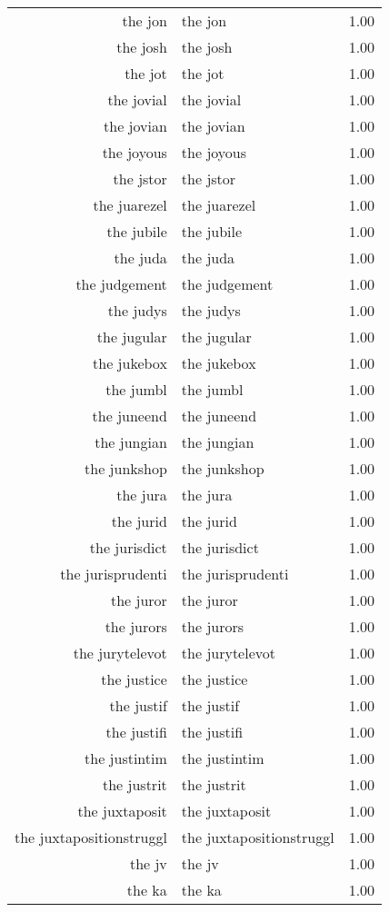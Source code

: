 \begin{table}[ht]
\begin{tabular}{rlr}
  the jon & the jon & 1.00 \\ 
  the josh & the josh & 1.00 \\ 
  the jot & the jot & 1.00 \\ 
  the jovial & the jovial & 1.00 \\ 
  the jovian & the jovian & 1.00 \\ 
  the joyous & the joyous & 1.00 \\ 
  the jstor & the jstor & 1.00 \\ 
  the juarezel & the juarezel & 1.00 \\ 
  the jubile & the jubile & 1.00 \\ 
  the juda & the juda & 1.00 \\ 
  the judgement & the judgement & 1.00 \\ 
  the judys & the judys & 1.00 \\ 
  the jugular & the jugular & 1.00 \\ 
  the jukebox & the jukebox & 1.00 \\ 
  the jumbl & the jumbl & 1.00 \\ 
  the juneend & the juneend & 1.00 \\ 
  the jungian & the jungian & 1.00 \\ 
  the junkshop & the junkshop & 1.00 \\ 
  the jura & the jura & 1.00 \\ 
  the jurid & the jurid & 1.00 \\ 
  the jurisdict & the jurisdict & 1.00 \\ 
  the jurisprudenti & the jurisprudenti & 1.00 \\ 
  the juror & the juror & 1.00 \\ 
  the jurors & the jurors & 1.00 \\ 
  the jurytelevot & the jurytelevot & 1.00 \\ 
  the justice & the justice & 1.00 \\ 
  the justif & the justif & 1.00 \\ 
  the justifi & the justifi & 1.00 \\ 
  the justintim & the justintim & 1.00 \\ 
  the justrit & the justrit & 1.00 \\ 
  the juxtaposit & the juxtaposit & 1.00 \\ 
  the juxtapositionstruggl & the juxtapositionstruggl & 1.00 \\ 
  the jv & the jv & 1.00 \\ 
  the ka & the ka & 1.00 \\ 

\end{tabular}
\end{table}
